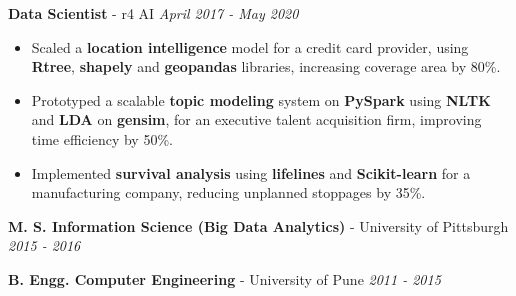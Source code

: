 \documentclass[hidelinks, 10pt, A4]{article} %
\begin{document}
\medskip

\noindent \centerline{\large \textbf{Data Scientist} \textcolor{bgcol}{ - r4 AI}
\hfill \it April 2017 - May 2020}
\begin{itemize}
  \item Scaled a \textbf{location intelligence} model for a credit card provider, using \textbf{Rtree}, \textbf{shapely} and \textbf{geopandas} libraries, increasing coverage area by 80\%.
  \item Prototyped a scalable \textbf{topic modeling} system on \textbf{PySpark} using \textbf{NLTK} and \textbf{LDA} on \textbf{gensim}, for an executive talent acquisition firm, improving time efficiency by 50\%.
  \item Implemented \textbf{survival analysis} using \textbf{lifelines} and \textbf{Scikit-learn} for a manufacturing company, reducing unplanned stoppages by 35\%.
\end{itemize}

{\color{mygray} \hrulefill }
\medskip

\noindent{\Large \textcolor{sectcol}{Education}}\medskip

\noindent \centerline{\large \textbf{M. S. Information Science (Big Data Analytics)} \textcolor{bgcol}{ - University of Pittsburgh} \hfill \it {2015 - 2016}}

\noindent \centerline{\large \textbf{B. Engg. Computer Engineering} \textcolor{bgcol}{ - University of Pune} \hfill \it {2011 - 2015}}

\medskip %
{\color{mygray} \hrulefill }
\end{document}
